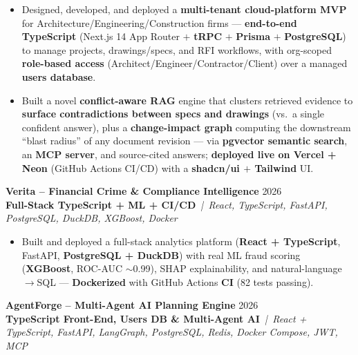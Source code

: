 \documentclass[a4paper,10pt]{article}
\newcommand{\projectEntry}[4]{%
  \vspace{1pt}%
  \noindent\textbf{\color{HeaderDark}#1} \hfill {\small\color{SubText}#2}\\[-4pt]%
  {\scriptsize\color{AccentTeal}\textbf{#3}} {\scriptsize\color{TechTag}\textit{\,|\, #4}}%
  \vspace{0pt}\par%
}
\begin{document}
\begin{itemize}[leftmargin=14pt, itemsep=0pt, parsep=0pt, topsep=1pt, label={\color{BulletColor}\textbf{--}}]
  \item {\small Designed, developed, and deployed a \textbf{multi-tenant cloud-platform MVP} for Architecture/Engineering/Construction firms --- \textbf{end-to-end TypeScript} (Next.js 14 App Router $+$ \textbf{tRPC} $+$ \textbf{Prisma} $+$ \textbf{PostgreSQL}) to manage projects, drawings/specs, and RFI workflows, with org-scoped \textbf{role-based access} (Architect/Engineer/Contractor/Client) over a managed \textbf{users database}.}
  \item {\small Built a novel \textbf{conflict-aware RAG} engine that clusters retrieved evidence to \textbf{surface contradictions between specs and drawings} (vs.\ a single confident answer), plus a \textbf{change-impact graph} computing the downstream ``blast radius'' of any document revision --- via \textbf{pgvector semantic search}, an \textbf{MCP server}, and source-cited answers; \textbf{deployed live on Vercel + Neon} (GitHub Actions CI/CD) with a \textbf{shadcn/ui $+$ Tailwind} UI.}
\end{itemize}

\vspace{1pt}

\projectEntry{Verita -- Financial Crime \& Compliance Intelligence}
  {2026}
  {Full-Stack TypeScript + ML + CI/CD}
  {React, TypeScript, FastAPI, PostgreSQL, DuckDB, XGBoost, Docker}

\begin{itemize}[leftmargin=14pt, itemsep=0pt, parsep=0pt, topsep=1pt, label={\color{BulletColor}\textbf{--}}]
  \item {\small Built and deployed a full-stack analytics platform (\textbf{React + TypeScript}, FastAPI, \textbf{PostgreSQL + DuckDB}) with real ML fraud scoring (\textbf{XGBoost}, ROC-AUC $\sim$0.99), SHAP explainability, and natural-language$\rightarrow$SQL --- \textbf{Dockerized} with GitHub Actions \textbf{CI} (82 tests passing).}
\end{itemize}

\vspace{1pt}

\projectEntry{AgentForge -- Multi-Agent AI Planning Engine}
  {2026}
  {TypeScript Front-End, Users DB \& Multi-Agent AI}
  {React + TypeScript, FastAPI, LangGraph, PostgreSQL, Redis, Docker Compose, JWT, MCP}
\end{document}
